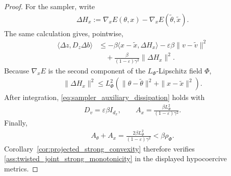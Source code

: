 \begin{proof}
For the sampler, write
\begin{align*}
\Delta H_x
:=
\nabla_xE(\theta,x)-\nabla_xE(\tilde\theta,\tilde x).
\end{align*}
The same calculation gives, pointwise,
\begin{align*}
\langle\Delta z,D_z\Delta b\rangle
&\leq
-\beta\langle x-\tilde x,\Delta H_x\rangle
-\varepsilon\beta\|v-\tilde v\|^2\\
&\quad+
\frac{\beta}{(1-\varepsilon)\gamma^2}
\|\Delta H_x\|^2.
\end{align*}
Because $\nabla_xE$ is the second component of the
$L_\Phi$-Lipschitz field $\Phi$,
\begin{align*}
\|\Delta H_x\|^2
\leq
L_\Phi^2
\left(
\|\theta-\tilde\theta\|^2+\|x-\tilde x\|^2
\right).
\end{align*}
After integration, \eqref{eq:sampler_auxiliary_dissipation} holds with
\begin{align*}
D_v=\varepsilon\beta I_{d_x},
\qquad
A_x
=\frac{\beta L_\Phi^2}{(1-\varepsilon)\gamma^2}.
\end{align*}
Finally,
\begin{align*}
A_\theta+A_x
=
\frac{2\beta L_\Phi^2}{(1-\varepsilon)\gamma^2}
<
\beta\rho_\Phi.
\end{align*}
Corollary~\ref{cor:projected_strong_convexity} therefore verifies
\ref{ass:twisted_joint_strong_monotonicity} in the displayed
hypocoercive metrics.
\end{proof}
